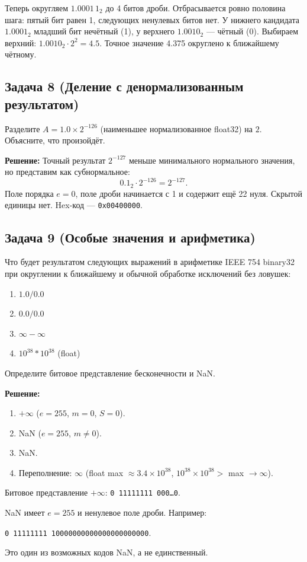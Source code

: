 Теперь округляем $1.0001\,1_2$ до 4 битов дроби. Отбрасывается
ровно половина шага: пятый бит равен 1, следующих ненулевых битов нет.
У нижнего кандидата $1.0001_2$ младший бит нечётный (1), у верхнего
$1.0010_2$ --- чётный (0). Выбираем верхний:
$1.0010_2\cdot2^2=4.5$. Точное значение 4.375 округлено к ближайшему чётному.

\subsection*{Задача 8 (Деление с денормализованным результатом)}
Разделите $A = 1.0 \times 2^{-126}$ (наименьшее нормализованное float32) на $2$. Объясните, что произойдёт.

\textbf{Решение:}
Точный результат $2^{-127}$ меньше минимального нормального значения,
но представим как субнормальное:
\[0.1_2\cdot2^{-126}=2^{-127}.\]
Поле порядка $e=0$, поле дроби начинается с 1 и содержит ещё 22 нуля.
Скрытой единицы нет. Hex-код --- \texttt{0x00400000}.

\subsection*{Задача 9 (Особые значения и арифметика)}
Что будет результатом следующих выражений в арифметике IEEE 754 binary32
при округлении к ближайшему и обычной обработке исключений без ловушек:
\begin{enumerate}
    \item[a)] $1.0 / 0.0$
    \item[b)] $0.0 / 0.0$
    \item[c)] $\infty - \infty$
    \item[d)] $10^{38} * 10^{38}$ (float)
\end{enumerate}
Определите битовое представление бесконечности и NaN.

\textbf{Решение:}
\begin{enumerate}
    \item[a)] $+\infty$ ($e=255$, $m=0$, $S=0$).
    \item[b)] NaN ($e=255$, $m\neq0$).
    \item[c)] NaN.
    \item[d)] Переполнение: $\infty$ (float max $\approx 3.4\times10^{38}$, $10^{38}\times10^{38} >$ max $\to \infty$).
\end{enumerate}
Битовое представление $+\infty$: \texttt{0 11111111 000\ldots0}.

NaN имеет $e=255$ и ненулевое поле дроби. Например:
\begin{center}\texttt{0 11111111 10000000000000000000000}.\end{center}
Это один из возможных кодов NaN, а не единственный.


